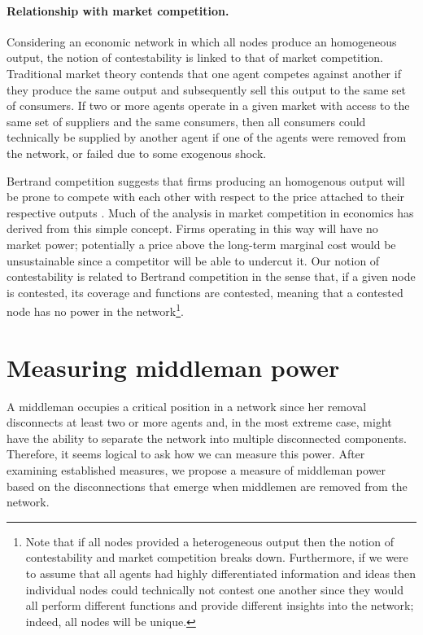 \paragraph{Relationship with market competition.}

Considering an economic network in which all nodes produce an homogeneous output, the notion of contestability is linked to that of market competition. Traditional market theory contends that one agent competes against another if they produce the same output and subsequently sell this output to the same set of consumers. If two or more agents operate in a given market with access to the same set of suppliers and the same consumers, then all consumers could technically be supplied by another agent if one of the agents were removed from the network, or failed due to some exogenous shock.

Bertrand competition suggests that firms producing an homogenous output will be prone to compete with each other with respect to the price attached to their respective outputs \citep{Edgeworth1881}. Much of the analysis in market competition in economics has derived from this simple concept. Firms operating in this way will have no market power; potentially a price above the long-term marginal cost would be unsustainable since a competitor will be able to undercut it. Our notion of contestability is related to Bertrand competition in the sense that, if a given node is contested, its coverage and functions are contested, meaning that a contested node has no power in the network\footnote{Note that if all nodes provided a heterogeneous output then the notion of contestability and market competition breaks down. Furthermore, if we were to assume that all agents had highly differentiated information and ideas then individual nodes could technically not contest one another since they would all perform different functions and provide different insights into the network; indeed, all nodes will be unique.}.

\section{Measuring middleman power}
\label{networkpower}

A middleman occupies a critical position in a network since her removal disconnects at least two or more agents and, in the most extreme case, might have the ability to separate the network into multiple disconnected components. Therefore, it seems logical to ask how we can measure this power. After examining established measures, we propose a measure of middleman power based on the disconnections that emerge when middlemen are removed from the network.

